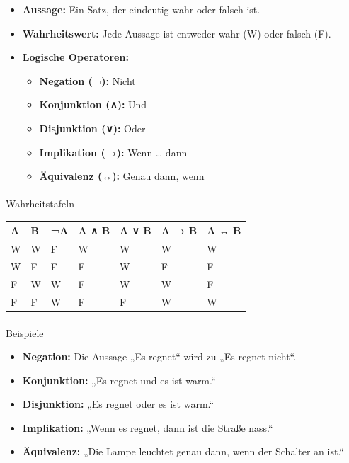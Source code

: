 \documentclass[
  11pt,
  a4paper,
  DIV=11,
  numbers=noendperiod]{scrartcl}
\makeatletter
\let\oldparagraph\paragraph
\renewcommand{\paragraph}{
    \@ifstar
      \xxxParagraphStar
      \xxxParagraphNoStar
  }
\newcommand{\xxxParagraphStar}[1]{\oldparagraph*{#1}\mbox{}}
\newcommand{\xxxParagraphNoStar}[1]{\oldparagraph{#1}\mbox{}}
\providecommand{\tightlist}{%
  \setlength{\itemsep}{0pt}\setlength{\parskip}{0pt}}\usepackage{longtable,booktabs,array}
\makeatother
\begin{document}
\begin{itemize}
\tightlist
\item
  \textbf{Aussage:} Ein Satz, der eindeutig wahr oder falsch ist.
\item
  \textbf{Wahrheitswert:} Jede Aussage ist entweder wahr (W) oder falsch
  (F).
\item
  \textbf{Logische Operatoren:}

  \begin{itemize}
  \tightlist
  \item
    \textbf{Negation (¬):} Nicht
  \item
    \textbf{Konjunktion (∧):} Und
  \item
    \textbf{Disjunktion (∨):} Oder
  \item
    \textbf{Implikation (→):} Wenn \ldots{} dann
  \item
    \textbf{Äquivalenz (↔):} Genau dann, wenn
  \end{itemize}
\end{itemize}

\paragraph{Wahrheitstafeln}\label{wahrheitstafeln}

\begin{longtable}[]{@{}lllllll@{}}
\toprule\noalign{}
A & B & ¬A & A ∧ B & A ∨ B & A → B & A ↔ B \\
\midrule\noalign{}
\endhead
\bottomrule\noalign{}
\endlastfoot
W & W & F & W & W & W & W \\
W & F & F & F & W & F & F \\
F & W & W & F & W & W & F \\
F & F & W & F & F & W & W \\
\end{longtable}

\paragraph{Beispiele}\label{beispiele}

\begin{itemize}
\tightlist
\item
  \textbf{Negation:} Die Aussage „Es regnet`` wird zu „Es regnet
  nicht``.
\item
  \textbf{Konjunktion:} „Es regnet und es ist warm.``
\item
  \textbf{Disjunktion:} „Es regnet oder es ist warm.``
\item
  \textbf{Implikation:} „Wenn es regnet, dann ist die Straße nass.``
\item
  \textbf{Äquivalenz:} „Die Lampe leuchtet genau dann, wenn der Schalter
  an ist.``
\end{itemize}
\end{document}
